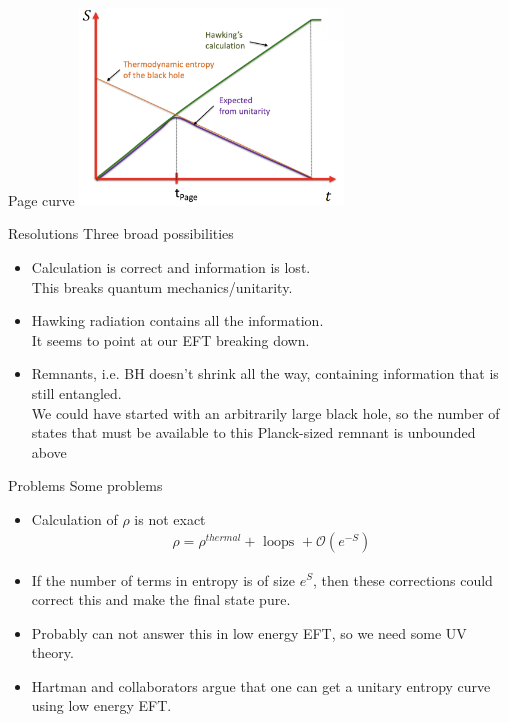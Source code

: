 \documentclass{beamer}[10]
\begin{document}
\begin{frame}{Page curve}{}
		\centering \includegraphics[width=7cm]{Page.png}		\vspace*{1cm}\newline
\end{frame}

\begin{frame}{Resolutions}{}
Three broad possibilities
\begin{itemize}
\item Calculation is correct and information is lost. \\
This breaks quantum mechanics/unitarity.
\item Hawking radiation contains all the information. \\ It seems to point at our EFT breaking down.
\item Remnants, i.e. BH doesn't shrink all the way, containing information that is still entangled. \\ 
We could have started with an arbitrarily large black hole, so
the number of states that must be available to this Planck-sized remnant is unbounded above
\end{itemize}
\end{frame}

\begin{frame}{Problems}{}
Some problems
	\begin{itemize}
		\item Calculation of $\rho$  is not exact
		\begin{equation}
			\begin{aligned}
				\rho=\rho^{thermal}+\text{ loops }+\mathcal{O}\left(e^{-S}\right)
			\end{aligned}
		\end{equation}
	\item If the number of terms in entropy is of size $e^{S}$, then these corrections could correct this and make the final state pure.
	\item Probably can not answer this in low energy EFT, so we need some UV theory.
	\item Hartman and collaborators argue that one can get a unitary entropy curve using low energy EFT. 
	\end{itemize}
\end{frame}
\end{document}
